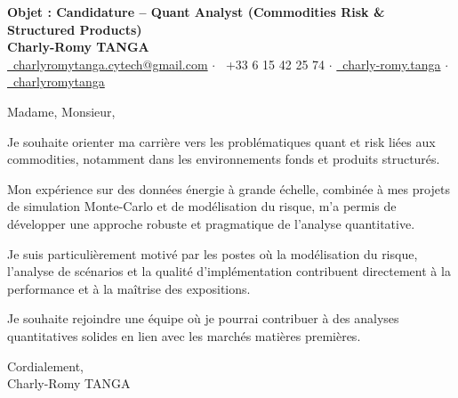 \documentclass[10pt, letterpaper]{article}
\begin{document}
\begin{center}
\textbf{\LARGE Objet : Candidature -- Quant Analyst (Commodities Risk \& Structured Products)}\\[0.2cm]
\textbf{\large Charly-Romy TANGA}\\[0.2cm]
\href{mailto:charlyromytanga.cytech@gmail.com}{\faEnvelope\ charlyromytanga.cytech@gmail.com} \quad$\cdot$\quad
\faPhone\ +33 6 15 42 25 74 \quad$\cdot$\quad
\href{https://www.linkedin.com/in/charly-romy-tanga}{\faLinkedin\ charly-romy.tanga} \quad$\cdot$\quad
\href{https://github.com/charlyromytanga}{\faGithub\ charlyromytanga}
\end{center}
Madame, Monsieur,

Je souhaite orienter ma carrière vers les problématiques quant et risk liées aux commodities, notamment dans les environnements fonds et produits structurés.

Mon expérience sur des données énergie à grande échelle, combinée à mes projets de simulation Monte-Carlo et de modélisation du risque, m'a permis de développer une approche robuste et pragmatique de l'analyse quantitative.

Je suis particulièrement motivé par les postes où la modélisation du risque, l'analyse de scénarios et la qualité d'implémentation contribuent directement à la performance et à la maîtrise des expositions.

Je souhaite rejoindre une équipe où je pourrai contribuer à des analyses quantitatives solides en lien avec les marchés matières premières.

Cordialement,\\
Charly-Romy TANGA
\end{document}
